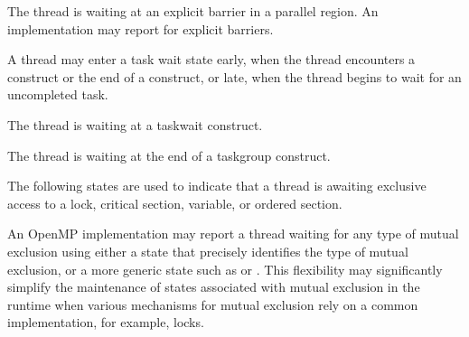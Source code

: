 \begin{description}
  \item {}

  The thread is waiting at an explicit barrier  in a parallel region.
  An implementation may report 
  for explicit barriers.


\end{description}


A thread may enter a task wait state early, when the thread encounters a
 construct or the end of a  construct, or late,
when the thread begins to wait for an uncompleted task.

\begin{description}

\item {}

  The thread is waiting at a taskwait construct. 

\item {}

  The thread is waiting at the end of a taskgroup construct. 

\end{description}



The following states are used
to indicate that a thread is
awaiting exclusive access to a lock, critical section, variable,
or ordered section.

An OpenMP implementation may report a thread waiting for any type
of mutual exclusion using either a state that precisely identifies
the type of mutual exclusion, or  a more generic state such as
 or .  This
flexibility may significantly simplify the maintenance of states
associated with mutual exclusion in the runtime when various
mechanisms for mutual exclusion rely on a common implementation,
for example, locks.

